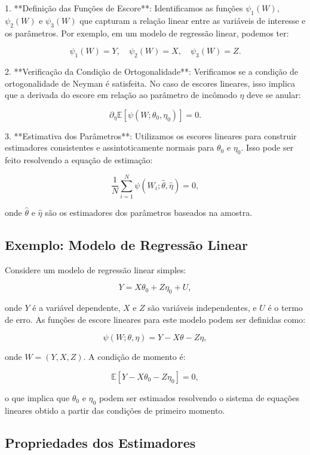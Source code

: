 \documentclass[a4paper,12pt]{article}[abntex2]
\begin{document}
1. **Definição das Funções de Escore**: Identificamos as funções $\psi_1(W)$, $\psi_2(W)$ e $\psi_3(W)$ que capturam a relação linear entre as variáveis de interesse e os parâmetros. Por exemplo, em um modelo de regressão linear, podemos ter:

\[
\psi_1(W) = Y, \quad \psi_2(W) = X, \quad \psi_3(W) = Z.
\]

2. **Verificação da Condição de Ortogonalidade**: Verificamos se a condição de ortogonalidade de Neyman é satisfeita. No caso de escores lineares, isso implica que a derivada do escore em relação ao parâmetro de incômodo $\eta$ deve se anular:

\[
\partial_\eta \mathbb{E}[\psi(W; \theta_0, \eta_0)] = 0.
\]

3. **Estimativa dos Parâmetros**: Utilizamos os escores lineares para construir estimadores consistentes e assintoticamente normais para $\theta_0$ e $\eta_0$. Isso pode ser feito resolvendo a equação de estimação:

\[
\frac{1}{N} \sum_{i=1}^N \psi(W_i; \hat{\theta}, \hat{\eta}) = 0,
\]

onde $\hat{\theta}$ e $\hat{\eta}$ são os estimadores dos parâmetros baseados na amostra.

\subsection*{Exemplo: Modelo de Regressão Linear}

Considere um modelo de regressão linear simples:

\[
Y = X\theta_0 + Z\eta_0 + U,
\]

onde $Y$ é a variável dependente, $X$ e $Z$ são variáveis independentes, e $U$ é o termo de erro. As funções de escore lineares para este modelo podem ser definidas como:

\[
\psi(W; \theta, \eta) = Y - X\theta - Z\eta,
\]

onde $W = (Y, X, Z)$. A condição de momento é:

\[
\mathbb{E}[Y - X\theta_0 - Z\eta_0] = 0,
\]

o que implica que $\theta_0$ e $\eta_0$ podem ser estimados resolvendo o sistema de equações lineares obtido a partir das condições de primeiro momento.

\subsection*{Propriedades dos Estimadores}
\end{document}
